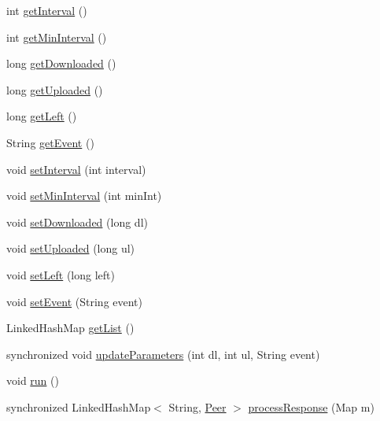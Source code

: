\begin{DoxyCompactItemize}
\item 
int \hyperlink{classj_bittorrent_a_p_i_1_1_peer_updater_a280462ebe5bef4985d1bc25f18ef6361}{getInterval} ()
\item 
int \hyperlink{classj_bittorrent_a_p_i_1_1_peer_updater_aaae6348e85643f01e4271e5adab95343}{getMinInterval} ()
\item 
long \hyperlink{classj_bittorrent_a_p_i_1_1_peer_updater_a191f9bf744b9ae2e5ff3a1b289d2a7e0}{getDownloaded} ()
\item 
long \hyperlink{classj_bittorrent_a_p_i_1_1_peer_updater_a4acde85b422ff44758973b2e4aa68329}{getUploaded} ()
\item 
long \hyperlink{classj_bittorrent_a_p_i_1_1_peer_updater_adc746875b9491ce52a930b404b11e9db}{getLeft} ()
\item 
String \hyperlink{classj_bittorrent_a_p_i_1_1_peer_updater_a4d6807681ed998c8a118874a4ad96cfd}{getEvent} ()
\item 
void \hyperlink{classj_bittorrent_a_p_i_1_1_peer_updater_addc5a75c5178250e19a15bb1697f8789}{setInterval} (int interval)
\item 
void \hyperlink{classj_bittorrent_a_p_i_1_1_peer_updater_a05728663a20a93596f60f4c1ce00464b}{setMinInterval} (int minInt)
\item 
void \hyperlink{classj_bittorrent_a_p_i_1_1_peer_updater_a2e61605bc665ddcbd7eb27818e736757}{setDownloaded} (long dl)
\item 
void \hyperlink{classj_bittorrent_a_p_i_1_1_peer_updater_abdc2d078d4cc82cfe54fa438d14d2f7a}{setUploaded} (long ul)
\item 
void \hyperlink{classj_bittorrent_a_p_i_1_1_peer_updater_aec85a3a1ec6776a6a1c90189cd233e55}{setLeft} (long left)
\item 
void \hyperlink{classj_bittorrent_a_p_i_1_1_peer_updater_ae34cb08d19d949f34eb0cc328e2d40f6}{setEvent} (String event)
\item 
LinkedHashMap \hyperlink{classj_bittorrent_a_p_i_1_1_peer_updater_ab7a3b7cfab6f53b0b5639e546ce9b28a}{getList} ()
\item 
synchronized void \hyperlink{classj_bittorrent_a_p_i_1_1_peer_updater_aa00f371b8c47900ba8b9ab6ed048a2b3}{updateParameters} (int dl, int ul, String event)
\item 
void \hyperlink{classj_bittorrent_a_p_i_1_1_peer_updater_ae394e8d995d2c0e21377356b5fe6bd20}{run} ()
\item 
synchronized LinkedHashMap$<$ String, \hyperlink{classj_bittorrent_a_p_i_1_1_peer}{Peer} $>$ \hyperlink{classj_bittorrent_a_p_i_1_1_peer_updater_ac94613dd370de3f689e8b2a68cea22c9}{processResponse} (Map m)

\end{DoxyCompactItemize}
